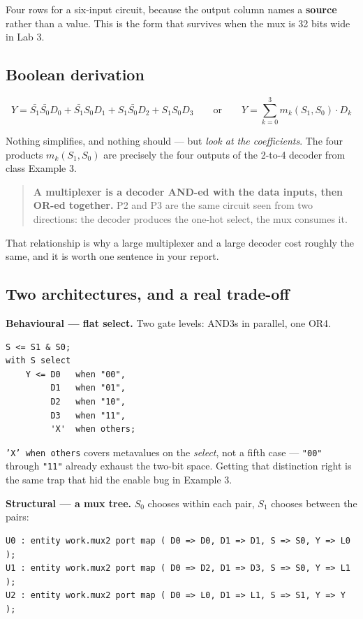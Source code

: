 \documentclass[11pt]{article}
\newcommand{\code}[1]{\texttt{#1}}
\begin{document}
Four rows for a six-input circuit, because the output column names a
\textbf{source} rather than a value. This is the form that survives when the mux is
32 bits wide in Lab 3.

\subsection*{Boolean derivation}

\[
Y = \bar{S_1}\bar{S_0}D_0 + \bar{S_1}S_0 D_1 + S_1\bar{S_0}D_2 + S_1 S_0 D_3
\qquad\text{or}\qquad
\boxed{Y = \sum_{k=0}^{3} m_k(S_1,S_0)\cdot D_k}
\]

Nothing simplifies, and nothing should --- but \emph{look at the coefficients}. The
four products $m_k(S_1,S_0)$ are precisely the four outputs of the 2-to-4 decoder
from class Example 3.

\begin{quote}
\textbf{A multiplexer is a decoder AND-ed with the data inputs, then OR-ed
together.} P2 and P3 are the same circuit seen from two directions: the decoder
produces the one-hot select, the mux consumes it.
\end{quote}

That relationship is why a large multiplexer and a large decoder cost roughly the
same, and it is worth one sentence in your report.

\subsection*{Two architectures, and a real trade-off}

\textbf{Behavioural --- flat select.} Two gate levels: AND3s in parallel, one OR4.

\begin{lstlisting}
S <= S1 & S0;
with S select
    Y <= D0   when "00",
         D1   when "01",
         D2   when "10",
         D3   when "11",
         'X'  when others;
\end{lstlisting}

\code{'X' when others} covers metavalues on the \emph{select}, not a fifth case ---
\code{"00"} through \code{"11"} already exhaust the two-bit space. Getting that
distinction right is the same trap that hid the enable bug in Example 3.

\textbf{Structural --- a mux tree.} $S_0$ chooses within each pair, $S_1$ chooses
between the pairs:

\begin{lstlisting}
U0 : entity work.mux2 port map ( D0 => D0, D1 => D1, S => S0, Y => L0 );
U1 : entity work.mux2 port map ( D0 => D2, D1 => D3, S => S0, Y => L1 );
U2 : entity work.mux2 port map ( D0 => L0, D1 => L1, S => S1, Y => Y  );
\end{lstlisting}
\end{document}
